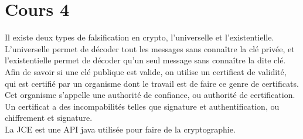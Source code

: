 \section{Cours 4}
Il existe deux types de falsification en crypto, l'universelle et l'existentielle. L'universelle permet de décoder tout
les messages sans connaître la clé privée, et l'existentielle permet de décoder qu'un seul message sans connaître la
dite clé.\\
Afin de savoir si une clé publique est valide, on utilise un certificat de validité, qui est certifié par un organisme
dont le travail est de faire ce genre de certificats. Cet organisme s'appelle une authorité de confiance, ou authorité
de certification.\\
Un certificat a des incompabilités telles que signature et authentification, ou chiffrement et signature.\\
La JCE est une API java utilisée pour faire de la cryptographie.
